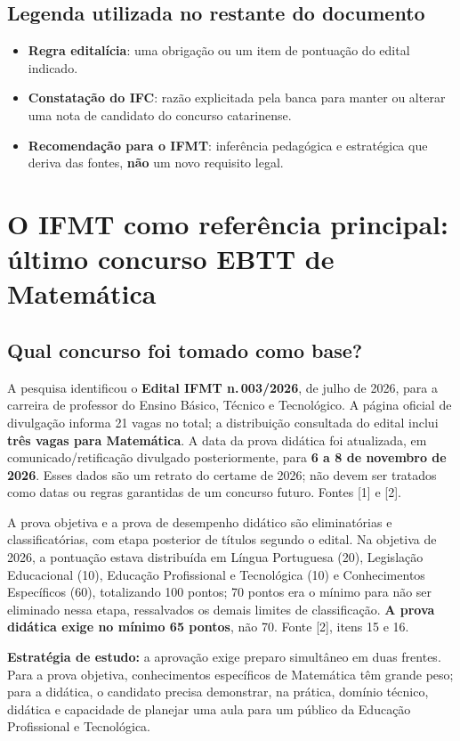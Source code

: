 \documentclass[11pt,a4paper]{article}
\begin{document}
\subsection{Legenda utilizada no restante do documento}
\begin{itemize}
\item \textbf{Regra editalícia}: uma obrigação ou um item de pontuação do edital indicado.
\item \textbf{Constatação do IFC}: razão explicitada pela banca para manter ou alterar uma nota de candidato do concurso catarinense.
\item \textbf{Recomendação para o IFMT}: inferência pedagógica e estratégica que deriva das fontes, \textbf{não} um novo requisito legal.
\end{itemize}

\section{O IFMT como referência principal: último concurso EBTT de Matemática}
\subsection{Qual concurso foi tomado como base?}
A pesquisa identificou o \textbf{Edital IFMT n.\,003/2026}, de julho de 2026, para a carreira de professor do Ensino Básico, Técnico e Tecnológico. A página oficial de divulgação informa 21 vagas no total; a distribuição consultada do edital inclui \textbf{três vagas para Matemática}. A data da prova didática foi atualizada, em comunicado/retificação divulgado posteriormente, para \textbf{6 a 8 de novembro de 2026}. Esses dados são um retrato do certame de 2026; não devem ser tratados como datas ou regras garantidas de um concurso futuro. Fontes [1] e [2].

A prova objetiva e a prova de desempenho didático são eliminatórias e classificatórias, com etapa posterior de títulos segundo o edital. Na objetiva de 2026, a pontuação estava distribuída em Língua Portuguesa (20), Legislação Educacional (10), Educação Profissional e Tecnológica (10) e Conhecimentos Específicos (60), totalizando 100 pontos; 70 pontos era o mínimo para não ser eliminado nessa etapa, ressalvados os demais limites de classificação. \textbf{A prova didática exige no mínimo 65 pontos}, não 70. Fonte [2], itens 15 e 16.

\begin{destaque}
\textbf{Estratégia de estudo:} a aprovação exige preparo simultâneo em duas frentes. Para a prova objetiva, conhecimentos específicos de Matemática têm grande peso; para a didática, o candidato precisa demonstrar, na prática, domínio técnico, didática e capacidade de planejar uma aula para um público da Educação Profissional e Tecnológica.
\end{destaque}
\end{document}
